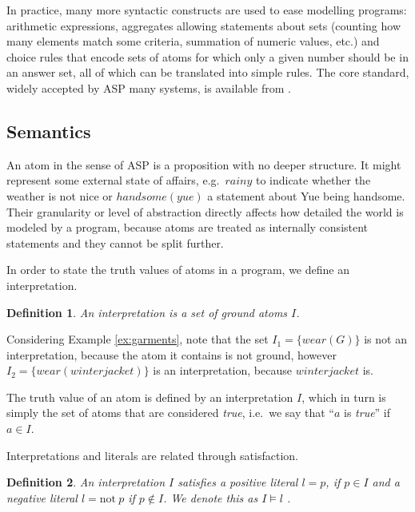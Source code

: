 \documentclass[final]{vutinfth} %
\newtheorem{definition}{Definition}[chapter]
\newcommand{\fail}{\mathrm{not } \ \xspace}
\begin{document}
In practice, many more syntactic constructs are used to ease modelling programs: arithmetic expressions, aggregates allowing statements about sets (counting how many elements match some criteria, summation of numeric values, etc.) and choice rules that encode sets of atoms for which only a given number should be in an answer set, all of which can be translated into simple rules. The core standard, widely accepted by ASP many systems, is available from \cite{calimeri2015asp}.

\subsection{Semantics}

An atom in the sense of ASP is a proposition with no deeper structure. It might represent some external state of affairs, e.g.~$rainy$ to indicate whether the weather is not nice or $handsome(yue)$ a statement about Yue being handsome. Their granularity or level of abstraction directly affects how detailed the world is modeled by a program, because atoms are treated as internally consistent statements and they cannot be split further.

In order to state the truth values of atoms in a program, we define an interpretation.

\begin{definition}
An \emph{interpretation} is a set of ground atoms $I$.
\end{definition}


Considering Example \ref{ex:garments}, note that the set $I_1 = \{ wear(G) \}$ is not an interpretation, because the atom it contains is not ground, however $I_2 = \{ wear(winterjacket) \}$ is an interpretation, because $winterjacket$ is.

The truth value of an atom is defined by an interpretation $I$, which in turn is simply the set of atoms that are considered \emph{true}, i.e.~we say that \enquote{$a$ is \emph{true}} if $a \in I$.

Interpretations and literals are related through satisfaction.

\begin{definition}
An interpretation $I$ \emph{satisfies} a positive literal $l = p$, if $p \in I$ and a negative literal $l = \fail p$ if $p \not \in I$. We denote this as $I \models l$ .
\end{definition}
\end{document}
